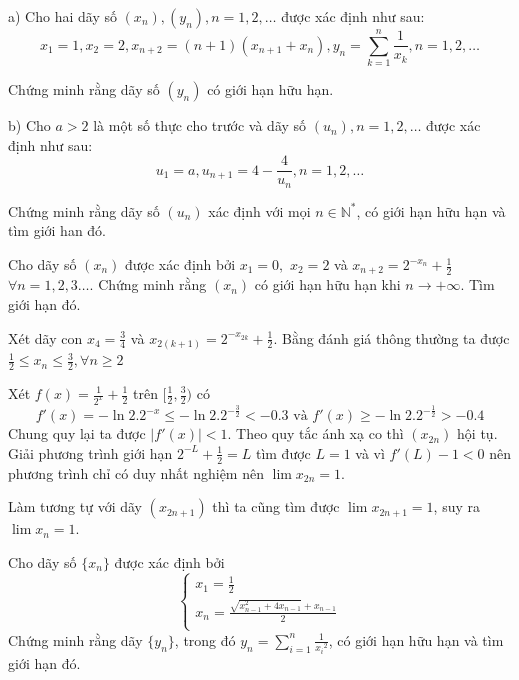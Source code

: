 \documentclass[11pt]{scrartcl}
\begin{document}
\begin{itemize}[label=, leftmargin=0em, itemsep=0.5em]
\begin{btvn}
        a) Cho hai dãy số $\left(x_n\right),\left(y_n\right), n=1,2, \ldots$ được xác định như sau:
        $$
        x_1=1, x_2=2, x_{n+2}=(n+1)\left(x_{n+1}+x_n\right), y_n=\sum_{k=1}^n \frac{1}{x_k}, n=1,2, \ldots
        $$

        Chứng minh rằng dãy số $\left(y_n\right)$ có giới hạn hữu hạn.

        b) Cho $a>2$ là một số thực cho trước và dãy số $\left(u_n\right), n=1,2, \ldots$ được xác định như sau:
        $$
        u_1=a, u_{n+1}=4-\frac{4}{u_n}, n=1,2, \ldots
        $$

        Chứng minh rằng dãy số $\left(u_n\right)$ xác định với mọi $n \in \mathbb{N}^*$, có giới hạn hữu hạn và tìm giới han đó.
    \end{btvn}
    

    \begin{bt}
        Cho dãy số $ (x_n)$ được xác định bởi $ x_1 = 0,$ $ x_2 = 2$ và $ x_{n+2} = 2^{-x_n} + \frac{1}{2}$ $ \forall n = 1,2,3 \ldots$. Chứng minh rằng $(x_n)$ có giới hạn hữu hạn khi $ n \to +\infty.$ Tìm giới hạn đó.
    \end{bt}

    \begin{sol}
        Xét dãy con $x_4 = \frac{3}{4}$ và $x_{2(k+1)} = 2^{-x_{2k}} + \frac{1}{2}$. Bằng đánh giá thông thường ta được $\frac{1}{2} \leq x_n \leq \frac{3}{2}, \forall n \geq 2$ 
        
        
        Xét $f(x) = \frac{1}{2^x} + \frac{1}{2}$ trên $[\frac{1}{2}, \frac{3}{2})$ có 
        \[f'(x) = -\ln2. 2^{-x} \leq -\ln2. 2^{-\frac{3}{2}} < -0.3 \text{ và } f'(x) \geq -\ln2. 2^{-\frac{1}{2}} > -0.4\]
        Chung quy lại ta được $|f'(x)| < 1$. Theo quy tắc ánh xạ co thì $(x_{2n})$ hội tụ. Giải phương trình giới hạn $2^{-L} + \frac{1}{2} = L$ tìm được $L = 1$ và vì $f'(L) - 1 < 0$ nên phương trình chỉ có duy nhất nghiệm nên $\lim x_{2n} = 1$. 


        Làm tương tự với dãy $(x_{2n + 1})$ thì ta cũng tìm được $\lim x_{2n + 1 } = 1$, suy ra $\lim x_n = 1$.
    \end{sol}
    \begin{bt}
        Cho dãy số $ \{x_n\}$ được xác định bởi \[ \left\{ \begin{array}{l}x_1  = \frac{1}{2} \\x_n  = \frac{{\sqrt {x_{n - 1} ^2  + 4x_{n - 1} }  + x_{n - 1} }}{2} \\\end{array} \right.\]
Chứng minh rằng dãy $ \{y_n\}$, trong đó $\displaystyle  y_n=\sum_{i=1}^{n}\frac{1}{{{x}_{i}}^{2}}$, có giới hạn hữu hạn và tìm giới hạn đó.
    \end{bt}


\end{itemize}
\end{document}
